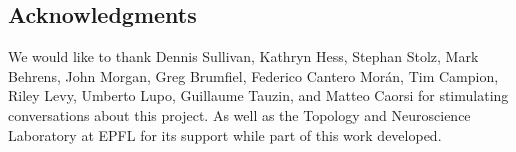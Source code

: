 
\subsection*{Acknowledgments} We would like to thank Dennis Sullivan, Kathryn Hess, Stephan Stolz, Mark Behrens, John Morgan, Greg Brumfiel, Federico Cantero Mor\'an, Tim Campion, Riley Levy, Umberto Lupo, Guillaume Tauzin, and Matteo Caorsi for stimulating conversations about this project.
As well as the Topology and Neuroscience Laboratory at EPFL for its support while part of this work developed.